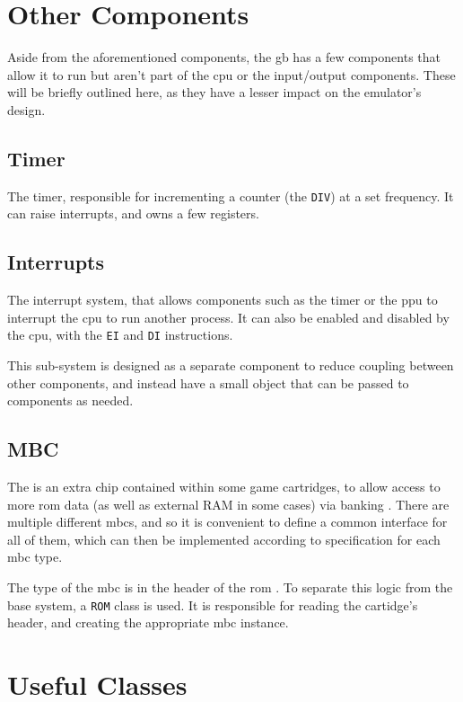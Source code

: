 \documentclass[11pt]{informatics-report}
\begin{document}
\section{Other Components}

Aside from the aforementioned components, the \gls{gb} has a few components that allow it to run but aren't part of the \gls{cpu} or the input/output components. These will be briefly outlined here, as they have a lesser impact on the emulator's design.

\subsection{Timer}

The timer, responsible for incrementing a counter (the \texttt{DIV}) at a set frequency. It can raise interrupts, and owns a few registers.

\subsection{Interrupts}

The interrupt system, that allows components such as the timer or the \gls{ppu} to interrupt the \gls{cpu} to run another process. It can also be enabled and disabled by the \gls{cpu}, with the \texttt{EI} and \texttt{DI} instructions.

This sub-system is designed as a separate component to reduce coupling between other components, and instead have a small object that can be passed to components as needed.

\subsection{MBC}

The  is an extra chip contained within some game cartridges, to allow access to more \gls{rom} data (as well as external RAM in some cases) via banking \cite[MBCs]{pandoc}. There are multiple different \glspl{mbc}, and so it is convenient to define a common interface for all of them, which can then be implemented according to specification for each \gls{mbc} type.

The type of the \gls{mbc} is in the header of the \gls{rom} \cite[The Cartridge Header]{pandoc}. To separate this logic from the base system, a \texttt{ROM} class is used. It is responsible for reading the cartidge's header, and creating the appropriate \gls{mbc} instance.

\section{Useful Classes}
\end{document}
